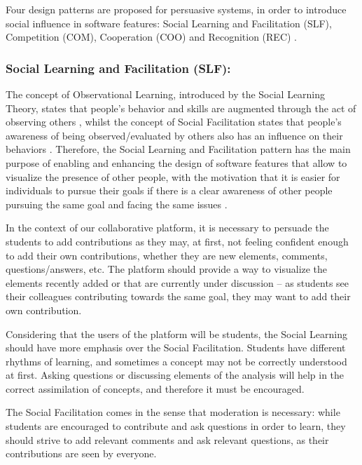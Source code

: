 Four design patterns are proposed for persuasive systems, in order to introduce social influence in software features: Social Learning and Facilitation (SLF), Competition (COM), Cooperation (COO) and Recognition (REC) \cite{oduor2014persuasive}. 

\subsubsection{Social Learning and Facilitation (SLF):}

The concept of Observational Learning, introduced by the Social Learning Theory, states that people's behavior and skills are augmented through the act of observing others \cite{bandura1977social}, whilst the concept of Social Facilitation states that people's awareness of being observed/evaluated by others also has an influence on their behaviors \cite{zajonc1965social}. Therefore, the Social Learning and Facilitation pattern has the main purpose of enabling and enhancing the design of software features that allow to visualize the presence of other people, with the motivation that it is easier for individuals to pursue their goals if there is a clear awareness of other people pursuing the same goal and facing the same issues \cite{oduor2014persuasive}. 

In the context of our collaborative platform, it is necessary to persuade the students to add contributions as they may, at first, not feeling confident enough to add their own contributions, whether they are new elements, comments, questions/answers, etc. The platform should provide a way to visualize the elements recently added or that are currently under discussion – as students see their colleagues contributing towards the same goal, they may want to add their own contribution.

Considering that the users of the platform will be students, the Social Learning should have more emphasis over the Social Facilitation. Students have different rhythms of learning, and sometimes a concept may not be correctly understood at first. Asking questions or discussing elements of the analysis will help in the correct assimilation of concepts, and therefore it must be encouraged.

The Social Facilitation comes in the sense that moderation is necessary: while students are encouraged to contribute and ask questions in order to learn, they should strive to add relevant comments and ask relevant questions, as their contributions are seen by everyone.

